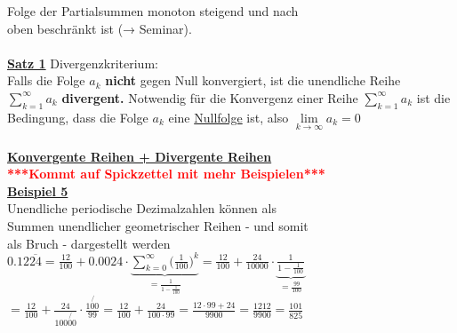 \documentclass[12pt,a4paper]{article}
\begin{document}
Folge der Partialsummen monoton steigend und nach\\
oben beschränkt ist (→ Seminar). \\
\\
\underline{\textbf{Satz 1}} Divergenzkriterium:\\
Falls die Folge $a_k$ \textbf{nicht} gegen Null konvergiert, ist die
unendliche Reihe\\ 
$\sum\limits_{k=1}^{\infty}a_k$ \textbf{divergent.}
Notwendig für die Konvergenz einer Reihe $\sum\limits_{k=1}^{\infty}a_k$ ist die Bedingung, dass die Folge $a_k$
eine \underline{Nullfolge} ist, also $\lim\limits_{k\rightarrow\infty}a_k=0$
\\
\\
\underline{\textbf{Konvergente Reihen + Divergente Reihen}}\\
\textcolor{red}{\textbf{***Kommt auf Spickzettel mit mehr Beispielen***}}
\\
\underline{\textbf{Beispiel 5}}\\
Unendliche periodische Dezimalzahlen können als \\
Summen unendlicher geometrischer Reihen - und somit \\
als Bruch - dargestellt werden\\
$0.12\overline{24}=\frac{12}{100}+0.0024\cdot\underbrace{\sum\limits_{k=0}^{\infty}\bigl(\frac{1}{100}\bigr)^k}_{=\frac{1}{1-\frac{1}{100}}}=\frac{12}{100}+\frac{24}{10000}\cdot\underbrace{\frac{1}{1-\frac{1}{100}}}_{=\frac{99}{100}}$
\\
$=\frac{12}{100}+\frac{24}{100\not{00}}\cdot\frac{1\not{00}}{99}=\frac{12}{100}+\frac{24}{100\cdot99}=\frac{12\cdot99+24}{9900}=\frac{1212}{9900}=\frac{101}{825}$
\end{document}
